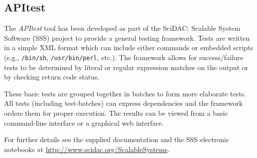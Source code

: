 %


\subsection{APItest}
\label{app:apitest}

The \emph{APItest} tool has been developed as part of the SciDAC: Scalable
System Software (SSS) project to provide a general testing framework.  Tests 
are written in a simple XML format which can include either commands or
embedded scripts (e.g., {\tt /bin/sh}, {\tt/usr/bin/perl}, etc.).  The
framework allows for success/failure tests to be determined by literal or
regular expression matches on the output or by checking return code status.  

These basic tests are grouped together in batches to form more elaborate
tests.  All tests (including test-batches) can express dependencies and the
framework orders them for proper execution.  The results can be viewed from
a basic command-line interface or a graphical web interface.  

For further details see the supplied documentation and the SSS electronic
notebooks at \url{http://www.scidac.org/ScalableSystems}.

